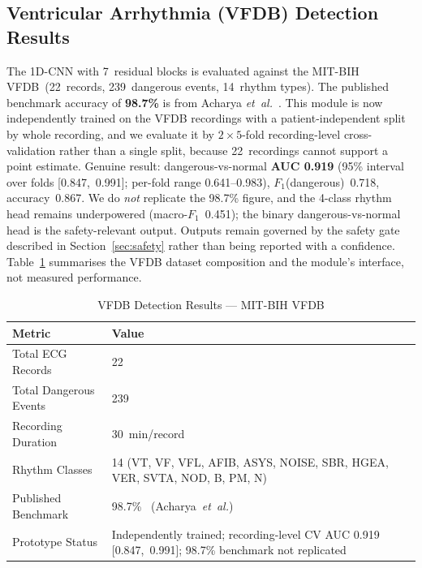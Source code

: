 \documentclass[AMA,STIX1COL,]{WileyNJD-v2}
\begin{document}
\subsection{Ventricular Arrhythmia (VFDB) Detection Results}

The 1D-CNN with 7~residual blocks is evaluated against the MIT-BIH
VFDB~(22~records, 239~dangerous events, 14~rhythm types).
The published benchmark accuracy of \textbf{98.7\%} is from
Acharya \emph{et~al.}~\cite{acharya2018}. This module is now
independently trained on the VFDB recordings with a patient-independent
split by whole recording, and we evaluate it by $2\times5$-fold
recording-level cross-validation rather than a single split, because
22~recordings cannot support a point estimate. Genuine result:
dangerous-vs-normal \textbf{AUC 0.919} (95\% interval over folds
[0.847,~0.991]; per-fold range 0.641--0.983),
$F_1$(dangerous)~0.718, accuracy~0.867. We do \emph{not} replicate the
98.7\% figure, and the 4-class rhythm head remains underpowered
(macro-$F_1$~0.451); the binary dangerous-vs-normal head is the
safety-relevant output. Outputs remain governed by the safety gate
described in
Section~\ref{sec:safety} rather than being reported with a confidence.
Table~\ref{tab:vfdb} summarises the VFDB dataset composition and the
module's interface, not measured performance.

\begin{table}[!t]
\caption{VFDB Detection Results — MIT-BIH VFDB}
\label{tab:vfdb}
\centering
\renewcommand{\arraystretch}{1.1}
\begin{tabular}{lp{3.4cm}}
\toprule
\textbf{Metric} & \textbf{Value}\\
\midrule
Total ECG Records       & 22\\
Total Dangerous Events  & 239\\
Recording Duration      & 30~min/record\\
Rhythm Classes          & 14 (VT, VF, VFL, AFIB, ASYS, NOISE, SBR, HGEA, VER, SVTA, NOD, B, PM, N)\\
Published Benchmark     & 98.7\%~\cite{acharya2018} (Acharya~\emph{et~al.})\\
Prototype Status        & Independently trained; recording-level CV AUC 0.919 [0.847,~0.991]; 98.7\% benchmark not replicated\\
\bottomrule
\end{tabular}
\end{table}
\end{document}

